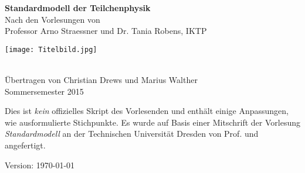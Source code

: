 \documentclass[a4paper,11pt,fleqn,parskip=full,captions=tableheading,draft]{scrbook}
\date{\today}
\newcommand{\lectitel}{Standardmodell der Teilchenphysik}
\newcommand{\authors}{Christian Drews und Marius Walther}
\begin{document}
\begin{titlepage}
	
\begin{center}
	{\fontsize{32}{40} \selectfont \textcolor{dpurple}{\textbf{\lectitel}}}\\[1.2cm]
	{\large Nach den Vorlesungen von}\\[0.3cm]
	{\LARGE Professor Arno Straessner und Dr. Tania Robens, IKTP}\\[2cm]
	\makebox[\linewidth]{\textcolor{lpurple}{\rule{\paperwidth}{1.3cm}}}
\end{center}
\vspace{-.7cm}
\hspace{-4.5cm}\texttt{[image: Titelbild.jpg]}
\vspace{-1cm}
\begin{center}
	\makebox[\linewidth]{\textcolor{lpurple}{\rule{\paperwidth}{1.3cm}}}\\[1cm]
	{\large Übertragen von \authors}\\[0.5cm]
	{\large Sommersemester 2015}
\end{center}
\end{titlepage}
\newpage
\thispagestyle{empty}
\null\vspace {.66\textheight}
Dies ist \emph{kein} offizielles Skript des Vorlesenden und enthält einige
Anpassungen, wie ausformulierte Stichpunkte. Es wurde auf Basis
einer Mitschrift der Vorlesung \textit{Standardmodell} an der
Technischen Universität Dresden von Prof.  und  angefertigt.

Version: \today
\restoregeometry

\tableofcontents


%
%
%
%
\end{document}
